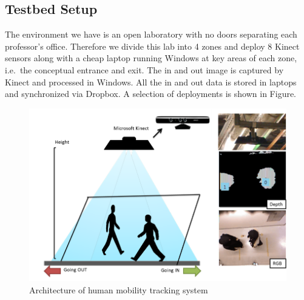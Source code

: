 \documentclass{sig-alternate}
\begin{document}
\subsection{Testbed Setup}
\label{sec:testbed-setup}

The environment we have is an open laboratory with no doors separating
each professor's office. Therefore we divide this lab into 4 zones and
deploy 8 Kinect sensors along with a cheap laptop running Windows at
key areas of each zone, i.e.\ the conceptual entrance and exit. The in
and out image is captured by Kinect and processed in Windows. All the
in and out data is stored in laptops and synchronized via Dropbox. A
selection of deployments is shown in Figure.


\begin{figure}[!tb]
  \centering
  \includegraphics[scale=0.5]{minisys}
  \caption{Architecture of human mobility tracking system}
  \label{fig:system-arch}
\end{figure}
\end{document}
